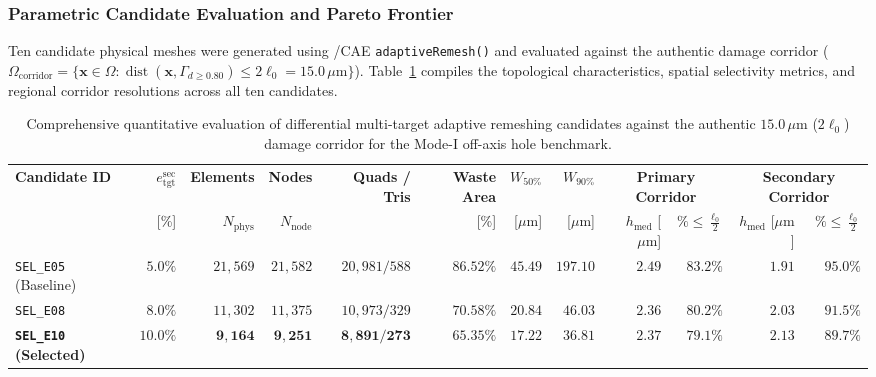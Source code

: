 \subsubsection{Parametric Candidate Evaluation and Pareto Frontier}
\label{subsubsec:candidate_evaluation_pareto}

Ten candidate physical meshes were generated using \Abaqus/CAE \texttt{adaptiveRemesh()} and evaluated against the authentic damage corridor ($\Omega_{\mathrm{corridor}} = \{\mathbf{x} \in \Omega : \operatorname{dist}(\mathbf{x}, \Gamma_{d \ge 0.80}) \le 2\ell_0 = 15.0\,\mu\mathrm{m}\}$). Table~\ref{tab:f1686_selective_remeshing_candidates} compiles the topological characteristics, spatial selectivity metrics, and regional corridor resolutions across all ten candidates.

\begin{table}[htbp]
\centering
\scriptsize
\setlength{\tabcolsep}{3.0pt}
\renewcommand{\arraystretch}{0.92}
\caption{Comprehensive quantitative evaluation of differential multi-target adaptive remeshing candidates against the authentic $15.0\,\mu\mathrm{m}$ ($2\ell_0$) damage corridor for the Mode-I off-axis hole benchmark.}
\label{tab:f1686_selective_remeshing_candidates}
\begin{tabular*}{\textwidth}{@{\extracolsep{\fill}}lrrrrrrrrrrr}
\hline
\textbf{Candidate ID} & $e_{\mathrm{tgt}}^{\mathrm{sec}}$ & \textbf{Elements} & \textbf{Nodes} & \textbf{Quads / Tris} & \textbf{Waste Area} & $W_{50\%}$ & $W_{90\%}$ & \multicolumn{2}{c}{\textbf{Primary Corridor}} & \multicolumn{2}{c}{\textbf{Secondary Corridor}} \\
 & [\%] & $N_{\mathrm{phys}}$ & $N_{\mathrm{node}}$ & & [\%] & [$\mu\mathrm{m}$] & [$\mu\mathrm{m}$] & $h_{\mathrm{med}}$ [$\mu\mathrm{m}$] & $\% \le \frac{\ell_0}{2}$ & $h_{\mathrm{med}}$ [$\mu\mathrm{m}$] & $\% \le \frac{\ell_0}{2}$ \\
\hline
\texttt{SEL\_E05} (Baseline) & $5.0\%$ & $21{,}569$ & $21{,}582$ & $20{,}981 / 588$ & $86.52\%$ & $45.49$ & $197.10$ & $2.49$ & $83.2\%$ & $1.91$ & $95.0\%$ \\
\texttt{SEL\_E08} & $8.0\%$ & $11{,}302$ & $11{,}375$ & $10{,}973 / 329$ & $70.58\%$ & $20.84$ & $46.03$ & $2.36$ & $80.2\%$ & $2.03$ & $91.5\%$ \\
\textbf{\texttt{SEL\_E10} (Selected)} & $\mathbf{10.0\%}$ & $\mathbf{9{,}164}$ & $\mathbf{9{,}251}$ & $\mathbf{8{,}891 / 273}$ & $\mathbf{65.35\%}$ & $\mathbf{17.22}$ & $\mathbf{36.81}$ & $\mathbf{2.37}$ & $\mathbf{79.1\%}$ & $\mathbf{2.13}$ & $\mathbf{89.7\%}$ \\

\end{tabular*}
\end{table}
